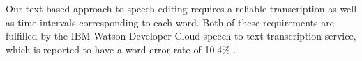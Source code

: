 Our text-based approach to speech editing requires a reliable transcription as well as time intervals corresponding to each word.
Both of these requirements are fulfilled by the IBM Watson Developer Cloud speech-to-text transcription service, which is reported to have a word error rate of 10.4\% \cite{soltau:2014}.